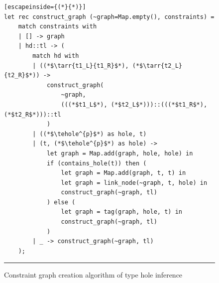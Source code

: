 


\begin{figure}[h!]
\begin{lstlisting}[escapeinside={(*}{*)}]
let rec construct_graph (~graph=Map.empty(), constraints) =
    match constraints with
    | [] -> graph
    | hd::tl -> (
        match hd with
        | ((*$\tarr{t1_L}{t1_R}$*), (*$\tarr{t2_L}{t2_R}$*)) ->
            construct_graph(
                ~graph, 
                (((*$t1_L$*), (*$t2_L$*)))::(((*$t1_R$*), (*$t2_R$*)))::tl
            )
        | ((*$\tehole^{p}$*) as hole, t)
        | (t, (*$\tehole^{p}$*) as hole) ->
            let graph = Map.add(graph, hole, hole) in
            if (contains_hole(t)) then (
                let graph = Map.add(graph, t, t) in
                let graph = link_node(~graph, t, hole) in
                construct_graph(~graph, tl)
            ) else (
                let graph = tag(graph, hole, t) in
                construct_graph(~graph, tl)
            )
        | _ -> construct_graph(~graph, tl)
    );

\end{lstlisting}
\vspace{-4px}
\hrule
\caption{Constraint graph creation algorithm of type hole inference}
\label{fig:algcode_construct_graph}
\end{figure}

